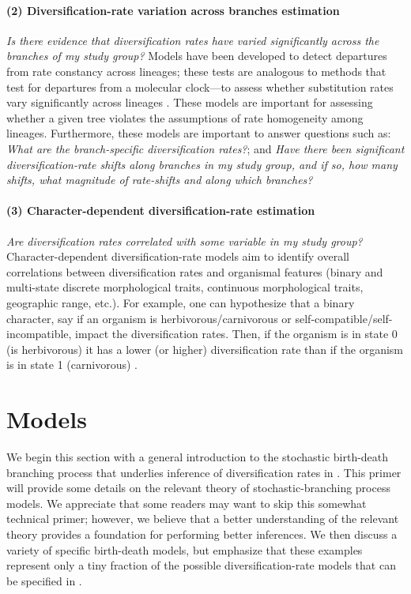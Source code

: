 \paragraph{(2) Diversification-rate variation across branches estimation}\textit{Is there evidence that diversification rates have varied significantly across the branches of my study group?}
Models have been developed to detect departures from rate constancy across lineages; these tests are analogous to methods that test for departures from a molecular clock---\IE to assess whether substitution rates vary significantly across lineages \citep{Alfaro2009,Rabosky2014a}.
These models are important for assessing whether a given tree violates the assumptions of rate homogeneity among lineages.
Furthermore, these models are important to answer questions such as:
\textit{What are the branch-specific diversification rates?}; and
\textit{Have there been significant diversification-rate shifts along branches in my study group, and if so, how many shifts, what magnitude of rate-shifts and along which branches?}


\paragraph{(3) Character-dependent diversification-rate estimation}\textit{Are diversification rates correlated with some variable in my study group?}
Character-dependent diversification-rate models aim to identify overall correlations between diversification rates and organismal features (binary and multi-state discrete morphological traits, continuous morphological traits, geographic range, etc.).
For example, one can hypothesize that a binary character, say if an organism is herbivorous/carnivorous or self-compatible/self-incompatible, impact the diversification rates.
Then, if the organism is in state 0 (\EG is herbivorous) it has a lower (or higher) diversification rate than if the organism is in state 1 (\EG carnivorous) \citep{Maddison2007}.


\section{Models}\label{sec:Models}

We begin this section with a general introduction to the stochastic birth-death branching process that underlies inference of diversification rates in \RevBayes.
This primer will provide some details on the relevant theory of stochastic-branching process models.
We appreciate that some readers may want to skip this somewhat technical primer; however, we believe that a better understanding of the relevant theory provides a foundation for performing better inferences.
We then discuss a variety of specific birth-death models, but emphasize that these examples represent only a tiny fraction of the possible diversification-rate models that can be specified in \RevBayes.

